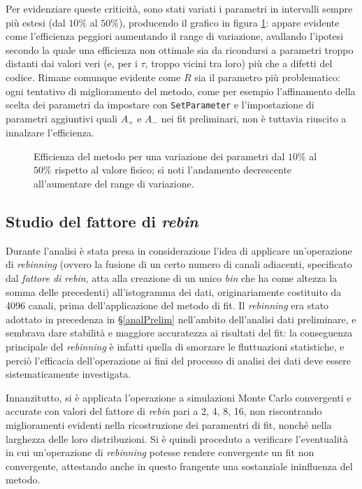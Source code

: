 \documentclass[10pt, oneside, a4paper]{article}   	%
\begin{document}
Per evidenziare queste criticità, sono stati variati i parametri in intervalli sempre più estesi (dal $10\%$ al $50\%$), producendo il grafico in figura \ref{fig:finalematrix}: appare evidente come l'efficienza peggiori aumentando il range di variazione, avallando l'ipotesi secondo la quale una efficienza non ottimale sia da ricondursi a parametri troppo distanti dai valori veri (e, per i $\tau$, troppo vicini tra loro) più che a difetti del codice. Rimane comunque evidente come $R$ sia il parametro più problematico: ogni tentativo di miglioramento del metodo, come per esempio l'affinamento della scelta dei parametri da impostare con \lstinline{SetParameter} e l'impostazione di parametri aggiuntivi quali $A_+$ e $A_-$ nei fit preliminari, non è tuttavia riuscito a innalzare l'efficienza.
%
\begin{figure}[H]
  \centering
  
  \caption{Efficienza del metodo per una variazione dei parametri dal $10 \%$ al $50\%$ rispetto al valore fisico; si noti l'andamento decrescente all'aumentare del range di variazione.}
  \label{fig:finalematrix}
\end{figure}
%
%
\subsection{Studio del fattore di \emph{rebin}} \label{parrebin}
Durante l'analisi è stata presa in considerazione l'idea di applicare un'operazione di \textit{rebinning} (ovvero la fusione di un certo numero di canali adiacenti, specificato dal \textit{fattore di rebin}, atta alla creazione di un unico \emph{bin} che ha come altezza la somma delle precedenti) all'istogramma dei dati, originariamente costituito da 4096 canali, prima dell'applicazione del metodo di fit. Il \textit{rebinning} era stato adottato in precedenza in \S\ref{analPrelim} nell'ambito dell'analisi dati preliminare, e sembrava dare stabilità e maggiore accuratezza ai risultati del fit: la conseguenza principale del \textit{rebinning} è infatti quella di smorzare le fluttuazioni statistiche, e perciò l'efficacia dell'operazione ai fini del processo di analisi dei dati deve essere sistematicamente investigata.

Innanzitutto, si è applicata l'operazione a simulazioni Monte Carlo convergenti e accurate con valori del fattore di \emph{rebin} pari a 2, 4, 8, 16, non riscontrando miglioramenti evidenti nella ricostruzione dei paramentri di fit, nonché nella larghezza delle loro distribuzioni. Si è quindi proceduto a verificare l'eventualità in cui un'operazione di \textit{rebinning} potesse rendere convergente un fit non convergente, attestando anche in questo frangente una sostanziale ininfluenza del metodo.
\end{document}
